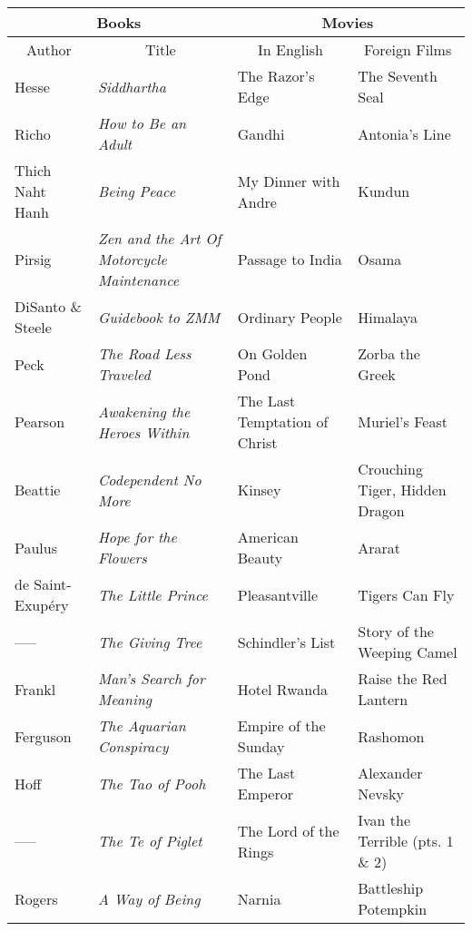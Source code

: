 \begin{sidewaystable*}[htb]
	\centering
	\begin{tabular}{|ll|l|l|}
		\hline
		\multicolumn{2}{|c|}{Books} & \multicolumn{2}{|c|}{Movies} \\
		\hline\hline
		\multicolumn{1}{|c}{Author} & \multicolumn{1}{c|}{Title} & \multicolumn{1}{c|}{In English} & \multicolumn{1}{c|}{Foreign Films} \\
		\hline
		Hesse 					& \emph{Siddhartha} 											& The Razor's Edge							& The Seventh Seal \\
		Richo 					& \emph{How to Be an Adult} 							& Gandhi 												& Antonia's Line \\
		Thich Naht Hanh & \emph{Being Peace} 											& My Dinner with Andre 					& Kundun \\
		Pirsig 					& \emph{Zen and the Art Of Motorcycle Maintenance} & Passage to India 		& Osama \\
		DiSanto \& Steele & \emph{Guidebook to ZMM} 							& Ordinary People 							& Himalaya \\
		Peck 						& \emph{The Road Less Traveled} 					& On Golden Pond 								& Zorba the Greek \\
		Pearson 				& \emph{Awakening the Heroes Within} 			& The Last Temptation of Christ & Muriel's Feast \\
		Beattie 				& \emph{Codependent No More} 							& Kinsey 												& Crouching Tiger, Hidden Dragon \\
		Paulus 					& \emph{Hope for the Flowers} 						& American Beauty 							& Ararat \\
		de Saint-Exup\'ery & \emph{The Little Prince} 						& Pleasantville 								& Tigers Can Fly \\
		----- 					& \emph{The Giving Tree} 									& Schindler's List 							& Story of the Weeping Camel \\
		Frankl 					& \emph{Man's Search for Meaning} 				& Hotel Rwanda 									& Raise the Red Lantern \\
		Ferguson 				& \emph{The Aquarian Conspiracy} 					& Empire of the Sunday 					& Rashomon \\
		Hoff 						& \emph{The Tao of Pooh} 									& The Last Emperor 							& Alexander Nevsky \\
		----- 					& \emph{The Te of Piglet} 								& The Lord of the Rings 				& Ivan the Terrible (pts. 1 \& 2) \\
		Rogers 					& \emph{A Way of Being} 									& Narnia 												& Battleship Potempkin \\

\end{tabular}
\end{sidewaystable*}
